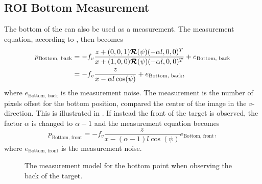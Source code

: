\newpage

\subsection{ROI Bottom Measurement}

The bottom of the \abbrROI can also be used as a measurement.
The measurement equation, according to , then becomes
%
\begin{equation}
\begin{split}
    p_{\text{Bottom, back}} &= -f_v \frac{z + (0,0,1) \bm{\mathcal{R}}(\psi) (- \alpha l,0,0)^T}{x + (1,0,0) \bm{\mathcal{R}}(\psi) (- \alpha l,0,0)^T} + e_{\text{Bottom, back}} \\
    &= -f_v \frac{z}{x - \alpha l \cos(\psi)} + e_{\text{Bottom, back}},
\end{split}
\end{equation}
%
where $e_{\text{Bottom, back}}$ is the measurement noise.
The measurement is the number of pixels offset for the bottom position, compared the center of the image in the $v$-direction.
This is illustrated in .
If instead the front of the target is observed, the factor $\alpha$ is changed to $\alpha-1$ and the measurement equation becomes
%
\begin{equation}
    p_{\text{Bottom, front}} =  -f_v \frac{z}{x - (\alpha - 1) l \cos(\psi)} e_{\text{Bottom, front}},
\end{equation}
where $e_{\text{Bottom, front}}$ is the measurement noise.

\begin{figure}[!ht]
    \centering
    \caption{\label{fig:measurementmodelbottom} The measurement model for the \abbrROI bottom point when observing the back of the target.}
\end{figure}

